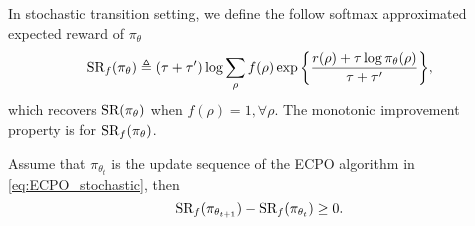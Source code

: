 In stochastic transition setting, we define the follow softmax approximated expected reward of $\pi_\theta$
\begin{equation*}
	\text{SR}_f(\pi_\theta) \triangleq (\tau + \tau^{\prime})\log{ \sum_{\rho}{ f(\rho) \exp\left\{ \frac{r(\rho) + \tau \log{\pi_\theta(\rho)} }{\tau + \tau^{\prime}} \right\} }},
\end{equation*}
which recovers $\text{SR}(\pi_\theta)$ when $f(\rho) = 1, \forall \rho$. The monotonic improvement property is for $\text{SR}_f(\pi_\theta)$.

\begin{thm}
\label{thm:monotonically_increasing_sr_property_stochastic}
Assume that $\pi_{\theta_{t}}$ is the update sequence of the ECPO algorithm in \cref{eq:ECPO_stochastic}, then
\begin{equation*}
	\text{SR}_f(\pi_{\theta_{t+1}}) - \text{SR}_f(\pi_{\theta_t})\ge 0.
\end{equation*}
\end{thm}
